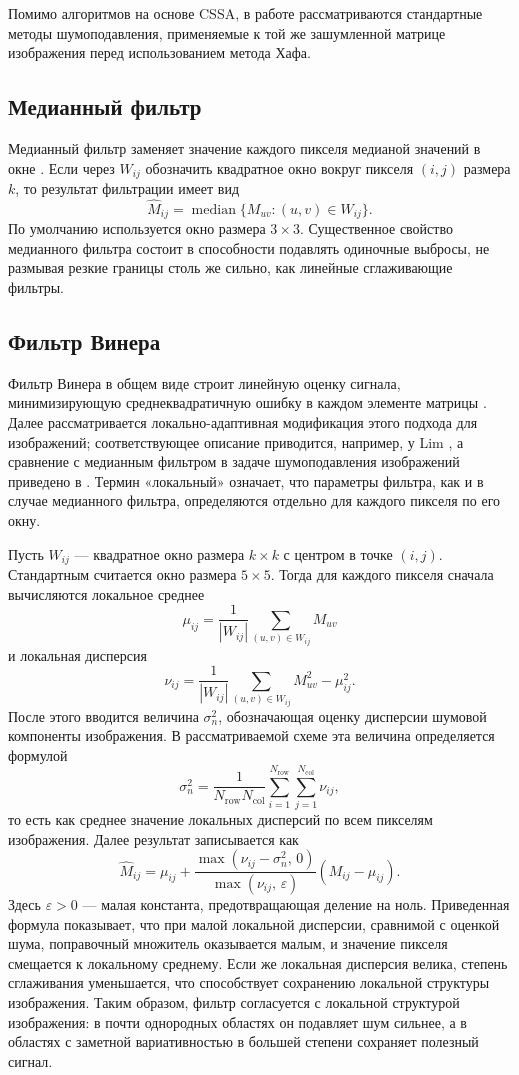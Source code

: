 Помимо алгоритмов на основе CSSA, в работе рассматриваются стандартные методы
шумоподавления, применяемые к той же зашумленной матрице изображения перед
использованием метода Хафа.

\subsection*{Медианный фильтр}

Медианный фильтр заменяет значение каждого пикселя медианой значений в окне
\cite{huang1979,mafi2019}. Если через $W_{ij}$ обозначить квадратное окно вокруг
пикселя $(i,j)$ размера $k$, то результат фильтрации имеет вид
\[
\widehat{M}_{ij} = \operatorname{median}\{M_{uv} \colon (u,v)\in W_{ij}\}.
\]
По умолчанию используется окно размера \(3\times 3\).
Существенное свойство медианного фильтра состоит в способности подавлять
одиночные выбросы, не размывая резкие границы столь же сильно, как линейные
сглаживающие фильтры.

\subsection*{Фильтр Винера}

Фильтр Винера в общем виде строит линейную оценку сигнала, минимизирующую
среднеквадратичную ошибку в каждом элементе матрицы \cite{wiener1949}. Далее
рассматривается локально-адаптивная модификация этого подхода для изображений;
соответствующее описание приводится, например, у Lim \cite{lim1990}, а сравнение
с медианным фильтром в задаче шумоподавления изображений приведено в
\cite{mafi2019}. Термин
«локальный» означает, что параметры фильтра, как и в случае медианного фильтра,
определяются отдельно для каждого пикселя по его окну.

Пусть $W_{ij}$ --- квадратное окно размера $k\times k$ с центром в точке
$(i,j)$. Стандартным считается окно размера \(5\times 5\). Тогда для каждого
пикселя сначала вычисляются локальное среднее
\[
\mu_{ij} = \frac{1}{|W_{ij}|}\sum_{(u,v)\in W_{ij}} M_{uv}
\]
и локальная дисперсия
\[
\nu_{ij} =
\frac{1}{|W_{ij}|}\sum_{(u,v)\in W_{ij}} M_{uv}^2 - \mu_{ij}^2.
\]
После этого вводится величина $\sigma_n^2$, обозначающая оценку дисперсии
шумовой компоненты изображения. В рассматриваемой схеме эта величина
определяется формулой
\[
\sigma_n^2 = \frac{1}{N_{\mathrm{row}}N_{\mathrm{col}}}\sum_{i=1}^{N_{\mathrm{row}}}\sum_{j=1}^{N_{\mathrm{col}}} \nu_{ij},
\]
то есть как среднее значение локальных дисперсий по всем пикселям изображения. Далее результат записывается как
\[
\widehat{M}_{ij}
=
\mu_{ij}
+
\frac{\max(\nu_{ij}-\sigma_n^2,\,0)}{\max(\nu_{ij},\,\varepsilon)}
\left(M_{ij}-\mu_{ij}\right).
\]
Здесь $\varepsilon>0$ --- малая константа, предотвращающая деление на ноль.
Приведенная формула показывает, что при малой локальной дисперсии, сравнимой с
оценкой шума, поправочный множитель оказывается малым, и значение пикселя
смещается к локальному среднему. Если же локальная дисперсия велика, степень
сглаживания уменьшается, что способствует сохранению локальной структуры
изображения. Таким образом, фильтр согласуется с локальной структурой
изображения: в почти однородных областях он подавляет шум сильнее, а в областях
с заметной вариативностью в большей степени сохраняет полезный сигнал.

